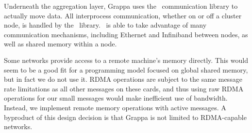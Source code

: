 Underneath the aggregation layer, Grappa uses the \gasnet~communication
library  to actually move data. All interprocess
communication, whether on or off a cluster node, is handled by the
\gasnet~library. \gasnet~is able to take advantage of many communication
mechanisms, including Ethernet and Infiniband between nodes, as well as
shared memory within a node.

Some networks provide access to a remote machine's memory
directly. This would seem to be a good fit for a programming model
focused on global shared memory, but in fact we do not use it. RDMA
operations are subject to the same message rate limitations as all
other messages on these cards, and thus using raw RDMA operations for
our small messages would make inefficient use of bandwidth. Instead,
we implement remote memory operations with active messages. A byproduct of this design decision is that Grappa is not limited
to RDMA-capable networks.
